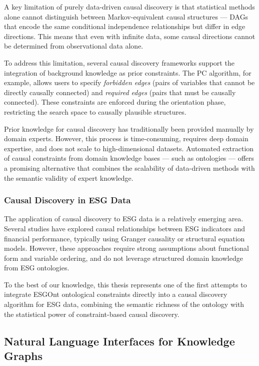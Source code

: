 \documentclass[a4paper,11pt,oneside]{article}
\begin{document}
A key limitation of purely data-driven causal discovery is that statistical methods alone cannot distinguish between Markov-equivalent causal structures — DAGs that encode the same conditional independence relationships but differ in edge directions. This means that even with infinite data, some causal directions cannot be determined from observational data alone.

To address this limitation, several causal discovery frameworks support the integration of background knowledge as prior constraints. The PC algorithm, for example, allows users to specify \textit{forbidden edges} (pairs of variables that cannot be directly causally connected) and \textit{required edges} (pairs that must be causally connected). These constraints are enforced during the orientation phase, restricting the search space to causally plausible structures.

Prior knowledge for causal discovery has traditionally been provided manually by domain experts. However, this process is time-consuming, requires deep domain expertise, and does not scale to high-dimensional datasets. Automated extraction of causal constraints from domain knowledge bases — such as ontologies — offers a promising alternative that combines the scalability of data-driven methods with the semantic validity of expert knowledge.

\subsubsection{Causal Discovery in ESG Data}

The application of causal discovery to ESG data is a relatively emerging area. Several studies have explored causal relationships between ESG indicators and financial performance, typically using Granger causality or structural equation models. However, these approaches require strong assumptions about functional form and variable ordering, and do not leverage structured domain knowledge from ESG ontologies.

To the best of our knowledge, this thesis represents one of the first attempts to integrate ESGOnt ontological constraints directly into a causal discovery algorithm for ESG data, combining the semantic richness of the ontology with the statistical power of constraint-based causal discovery.

\subsection{Natural Language Interfaces for Knowledge Graphs}
\end{document}
